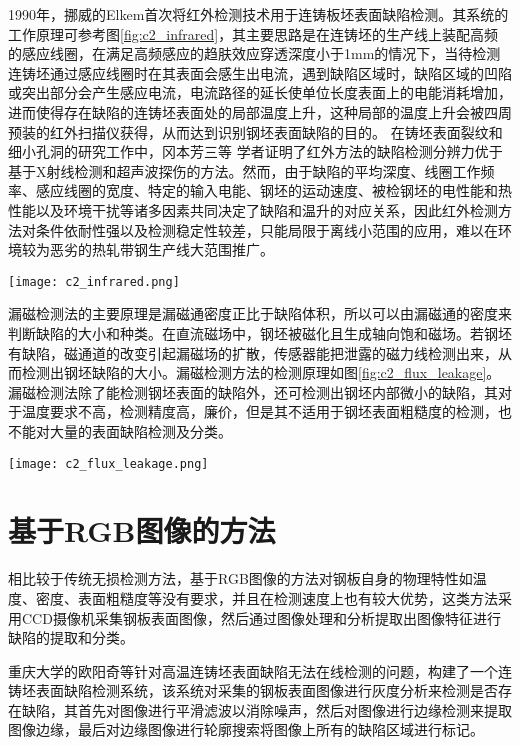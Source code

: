     1990年，挪威的Elkem首次将红外检测技术用于连铸板坯表面缺陷检测。其系统的工作原理可参考图\ref{fig:c2_infrared}，其主要思路是在连铸坯的生产线上装配高频的感应线圈，在满足高频感应的趋肤效应穿透深度小于1mm的情况下，当待检测连铸坯通过感应线圈时在其表面会感生出电流，遇到缺陷区域时，缺陷区域的凹陷或突出部分会产生感应电流，电流路径的延长使单位长度表面上的电能消耗增加，进而使得存在缺陷的连铸坯表面处的局部温度上升，这种局部的温度上升会被四周预装的红外扫描仪获得，从而达到识别钢坯表面缺陷的目的\cite{Vascotto1996High}。 在铸坯表面裂纹和细小孔洞的研究工作中，冈本芳三等\cite{Ooka1988Detection} 学者证明了红外方法的缺陷检测分辨力优于基于X射线检测和超声波探伤的方法。然而，由于缺陷的平均深度、线圈工作频率、感应线圈的宽度、特定的输入电能、钢坯的运动速度、被检钢坯的电性能和热性能以及环境干扰等诸多因素共同决定了缺陷和温升的对应关系，因此红外检测方法对条件依耐性强以及检测稳定性较差，只能局限于离线小范围的应用，难以在环境较为恶劣的热轧带钢生产线大范围推广。

    \begin{figure*}[!h]
    \centering
    \texttt{[image: c2\_infrared.png]}
    \caption{红外检测原理}
    \label{fig:c2_infrared}
    \end{figure*}

    漏磁检测法的主要原理是漏磁通密度正比于缺陷体积，所以可以由漏磁通的密度来判断缺陷的大小和种类。在直流磁场中，钢坯被磁化且生成轴向饱和磁场。若钢坯有缺陷，磁通道的改变引起漏磁场的扩散，传感器能把泄露的磁力线检测出来，从而检测出钢坯缺陷的大小。漏磁检测方法的检测原理如图\ref{fig:c2_flux_leakage}。 漏磁检测法除了能检测钢坯表面的缺陷外，还可检测出钢坯内部微小的缺陷，其对于温度要求不高，检测精度高，廉价，但是其不适用于钢坯表面粗糙度的检测，也不能对大量的表面缺陷检测及分类。

    \begin{figure*}[!h]
    \centering
    \texttt{[image: c2\_flux\_leakage.png]}
    \caption{漏磁检测原理}
    \label{fig:c2_flux_leakage}
    \end{figure*}

    \section{基于RGB图像的方法}
    相比较于传统无损检测方法，基于RGB图像的方法对钢板自身的物理特性如温度、密度、表面粗糙度等没有要求，并且在检测速度上也有较大优势，这类方法采用CCD摄像机采集钢板表面图像，然后通过图像处理和分析提取出图像特征进行缺陷的提取和分类。

    重庆大学的欧阳奇等\cite{欧阳奇2007高温连铸坯表面缺陷的机器视觉无损检测}针对高温连铸坯表面缺陷无法在线检测的问题，构建了一个连铸坯表面缺陷检测系统，该系统对采集的钢板表面图像进行灰度分析来检测是否存在缺陷，其首先对图像进行平滑滤波以消除噪声，然后对图像进行边缘检测来提取图像边缘，最后对边缘图像进行轮廓搜索将图像上所有的缺陷区域进行标记。

